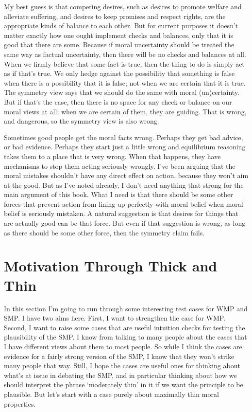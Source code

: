My best guess is that competing desires, such as desires to promote welfare and alleviate suffering, and desires to keep promises and respect rights, are the appropriate kinds of balance to each other. But for current purposes it doesn't matter exactly how one ought implement checks and balances, only that it is good that there are some. Because if moral uncertainty should be treated the same way as factual uncertainty, then there will be no checks and balances at all. When we firmly believe that some fact is true, then the thing to do is simply act as if that's true. We only hedge against the possibility that something is false when there is a possibility that it is false; not when we are certain that it is true. The symmetry view says that we should do the same with moral (un)certainty. But if that's the case, then there is no space for any check or balance on our moral views at all; when we are certain of them, they are guiding. That is wrong, and dangerous, so the symmetry view is also wrong.

Sometimes good people get the moral facts wrong. Perhaps they get bad advice, or bad evidence. Perhaps they start just a little wrong and equilibrium reasoning takes them to a place that is very wrong. When that happens, they have mechanisms to stop them acting seriously wrongly. I've been arguing that the moral mistakes shouldn't have any direct effect on action, because they won't aim at the good. But as I've noted already, I don't need anything that strong for the main argument of this book. What I need is that there should be some other forces that prevent action from lining up perfectly with moral belief when moral belief is seriously mistaken. A natural suggestion is that desires for things that are actually good can be that force. But even if that suggestion is wrong, as long as there should be some other force, then the symmetry claim fails.

\section{Motivation Through Thick and Thin}
\label{motivationthroughthickandthin}

In this section I'm going to run through some interesting test cases for WMP and SMP. I have two aims here. First, I want to strengthen the case for WMP. Second, I want to raise some cases that are useful intuition checks for testing the plausibility of the SMP. I know from talking to many people about the cases that I have different views about them to most people. So while I think the cases are evidence for a fairly strong version of the SMP, I know that they won't strike many people that way. Still, I hope the cases are useful ones for thinking about what's at issue in debating the SMP, and in particular thinking about how we should interpret the phrase `moderately thin' in it if we want the principle to be plausible. But let's start with a case purely about maximally thin moral properties.

